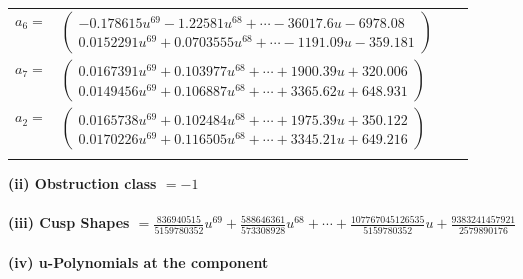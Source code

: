 \documentclass[1p]{elsarticle_modified}
\theoremstyle{definition}
\begin{document}
\begin{tabular}{m{7pt} m{180pt} m{7pt} m{180pt} }
\flushright $a_{6}=$&$\begin{pmatrix}-0.178615 u^{69}-1.22581 u^{68}+\cdots-36017.6 u-6978.08\\0.0152291 u^{69}+0.0703555 u^{68}+\cdots-1191.09 u-359.181\end{pmatrix}$ \\
\flushright $a_{7}=$&$\begin{pmatrix}0.0167391 u^{69}+0.103977 u^{68}+\cdots+1900.39 u+320.006\\0.0149456 u^{69}+0.106887 u^{68}+\cdots+3365.62 u+648.931\end{pmatrix}$ \\
\flushright $a_{2}=$&$\begin{pmatrix}0.0165738 u^{69}+0.102484 u^{68}+\cdots+1975.39 u+350.122\\0.0170226 u^{69}+0.116505 u^{68}+\cdots+3345.21 u+649.216\end{pmatrix}$\\&\end{tabular}
\flushleft \textbf{(ii) Obstruction class $= -1$}\\~\\
\flushleft \textbf{(iii) Cusp Shapes $= \frac{836940515}{5159780352} u^{69}+\frac{588646361}{573308928} u^{68}+\cdots+\frac{107767045126535}{5159780352} u+\frac{9383241457921}{2579890176}$}\\~\\
\newpage\renewcommand{\arraystretch}{1}
\flushleft \textbf{(iv) u-Polynomials at the component}\newline \\
\end{document}
